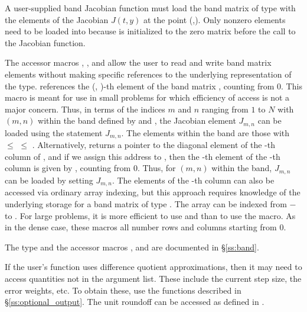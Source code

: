 {
  A user-supplied band Jacobian function must load the band matrix 
  of type  with the elements of the Jacobian $J(t,y)$ at the
  point (,).  Only nonzero elements need to be loaded into
   because  is initialized to the zero matrix before the call to the
  Jacobian function.  

  The accessor macros , , and  
  allow the user to read and write band matrix elements without making specific 
  references to the underlying representation of the  type.
   references the (, )-th element of the 
  band matrix , counting from $0$.
  This macro is meant for use in small problems for which efficiency of access is not
  a major concern.  Thus, in terms of the indices $m$ and $n$ ranging from $1$ to
  $N$ with $(m,n)$ within the band defined by  and
  , the Jacobian element $J_{m,n}$ can be loaded using the 
  statement  $J_{m,n}$. The elements within
  the band are those with  $\le$  $\le$ .
  Alternatively,  returns a pointer to the diagonal element
  of the -th column of , and if we assign this address to 
  , then the -th element of the -th column is
  given by , counting from $0$.
  Thus, for $(m,n)$ within the band, $J_{m,n}$ can be loaded by setting 
   
  $J_{m,n}$.  The elements of the -th column can also be accessed
  via ordinary array indexing, but this approach requires knowledge of
  the underlying storage for a band matrix of type .  
  The array  can be indexed from $-$ to .
  For large problems, it is more efficient to use
   and  than to use the
   macro.  As in the dense case, these macros all number rows
  and columns starting from $0$.  

  The  type and the accessor macros ,  and
   are documented in \S\ref{ss:band}.

  If the user's  function uses difference quotient approximations, then
  it may need to access quantities not in the argument list. These include the current
  step size, the error weights, etc. To obtain these, use the 
  functions described in \S\ref{ss:optional_output}. The unit roundoff can be
  accessed as  defined in .
}

